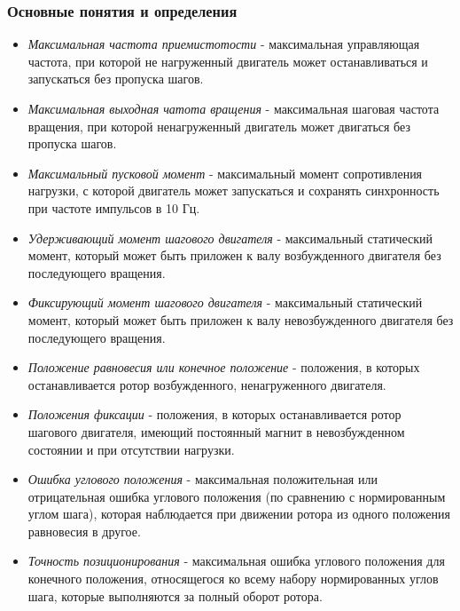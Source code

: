 \subsubsection{Основные понятия и определения}

\begin{itemize}
    \item \textit{Максимальная частота приемистотости} - максимальная управляющая частота,
    при которой не нагруженный двигатель может останавливаться и запускаться без пропуска шагов.

    \item \textit{Максимальная выходная чатота вращения} - максимальная шаговая частота вращения,
    при которой ненагруженный двигатель может двигаться без пропуска шагов.

    \item \textit{Максимальный пусковой момент} - максимальный момент сопротивления нагрузки,
    с которой двигатель может запускаться и сохранять синхронность при частоте импульсов в 10 Гц.

    \item \textit{Удерживающий момент шагового двигателя} - максимальный статический момент,
    который может быть приложен к валу возбужденного двигателя без последующего вращения.

    \item \textit{Фиксирующий момент шагового двигателя} - максимальный статический момент,
    который может быть приложен к валу невозбужденного двигателя без последующего вращения.

    \item \textit{Положение равновесия или конечное положение} - положения, в которых
    останавливается ротор возбужденного, ненагруженного двигателя.

    \item \textit{Положения фиксации} - положения, в которых останавливается ротор шагового
    двигателя, имеющий постоянный магнит в невозбужденном состоянии и при отсутствии нагрузки.

    \item \textit{Ошибка углового положения} - максимальная положительная или отрицательная ошибка
    углового положения (по сравнению с нормированным углом шага), которая наблюдается при движении
    ротора из одного положения равновесия в другое.

    \item \textit{Точность позиционирования} - максимальная ошибка углового положения для конечного
    положения, относящегося ко всему набору нормированных углов шага, которые выполняются за полный
    оборот ротора.
\end{itemize}
